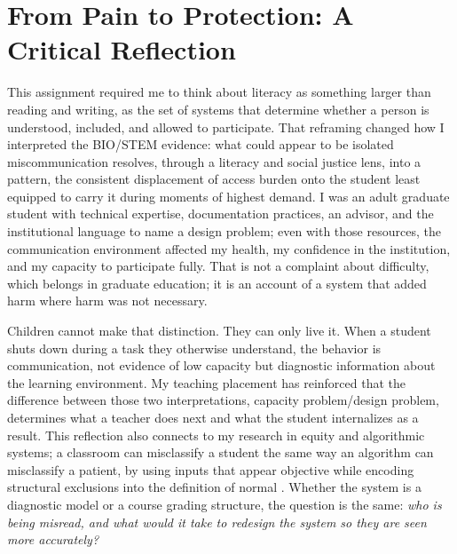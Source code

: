 \documentclass[11pt]{article}
\begin{document}
\section*{From Pain to Protection: A Critical Reflection}
\vspace{-1em}
This assignment required me to think about literacy as something larger than reading and writing, as the set of systems that determine whether a person is understood, included, and allowed to participate. That reframing changed how I interpreted the BIO/STEM evidence: what could appear to be isolated miscommunication resolves, through a literacy and social justice lens, into a pattern, the consistent displacement of access burden onto the student least equipped to carry it during moments of highest demand. I was an adult graduate student with technical expertise, documentation practices, an advisor, and the institutional language to name a design problem; even with those resources, the communication environment affected my health, my confidence in the institution, and my capacity to participate fully. That is not a complaint about difficulty, which belongs in graduate education; it is an account of a system that added harm where harm was not necessary.

Children cannot make that distinction. They can only live it. When a student shuts down during a task they otherwise understand, the behavior is communication, not evidence of low capacity but diagnostic information about the learning environment. My teaching placement has reinforced that the difference between those two interpretations, capacity problem/design problem, determines what a teacher does next and what the student internalizes as a result. This reflection also connects to my research in equity and algorithmic systems; a classroom can misclassify a student the same way an algorithm can misclassify a patient, by using inputs that appear objective while encoding structural exclusions into the definition of normal \citep{ncld2020disproportionality}. Whether the system is a diagnostic model or a course grading structure, the question is the same: \textit{who is being misread, and what would it take to redesign the system so they are seen more accurately?}
\end{document}
